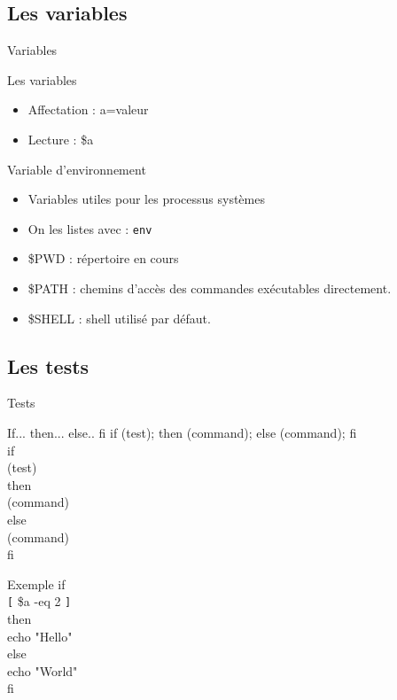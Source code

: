 \subsection{Les variables}
\begin{frame}{Variables}
\begin{block}{Les variables}
\begin{itemize}
\item Affectation : a=valeur
\item Lecture : \$a
\end{itemize}
\end{block}

\begin{block}{Variable d'environnement}
\begin{itemize}
\item Variables utiles pour les processus systèmes
\item On les listes avec : \texttt{env}
\item {\$}PWD : répertoire en cours
\item {\$}PATH : chemins d'accès des commandes exécutables directement.
\item {\$}SHELL : shell utilisé par défaut.	
\end{itemize}
\end{block}
\end{frame}

\subsection{Les tests}
\begin{frame}{Tests}
\begin{block}{If... then... else.. fi}
if (test); then (command); else (command); fi\\
if\\
(test)\\
then\\
(command)\\
else\\
 (command)\\
fi
\end{block}

\begin{block}{Exemple}
if\\
 \verb![! {\$}a -eq 2 \verb!]!\\
then\\
echo "Hello"\\
else\\
 echo "World"\\
fi
\end{block}

\end{frame}

